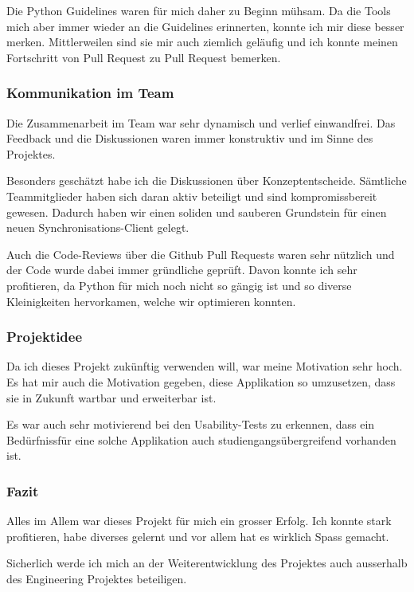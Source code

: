 \documentclass[a4paper]{article}
\begin{document}
  Die Python Guidelines waren für mich daher zu Beginn mühsam.
  Da die Tools mich aber immer wieder an die Guidelines erinnerten, konnte ich mir diese besser merken.
  Mittlerweilen sind sie mir auch ziemlich geläufig und ich konnte meinen Fortschritt von Pull Request zu Pull Request bemerken.

  \subsubsection{Kommunikation im Team}

  Die Zusammenarbeit im Team war sehr dynamisch und verlief einwandfrei.
  Das Feedback und die Diskussionen waren immer konstruktiv und im Sinne des Projektes.

  Besonders geschätzt habe ich die Diskussionen über Konzeptentscheide.
  Sämtliche Teammitglieder haben sich daran aktiv beteiligt und sind kompromissbereit gewesen.
  Dadurch haben wir einen soliden und sauberen Grundstein für einen neuen Synchronisations-Client gelegt.

  Auch die Code-Reviews über die Github Pull Requests waren sehr nützlich und der Code wurde dabei immer gründliche geprüft.
  Davon konnte ich sehr profitieren, da Python für mich noch nicht so gängig ist und so diverse Kleinigkeiten hervorkamen, welche wir optimieren konnten.

  \subsubsection{Projektidee}

  Da ich dieses Projekt zukünftig verwenden will, war meine Motivation sehr hoch.
  Es hat mir auch die Motivation gegeben, diese Applikation so umzusetzen, dass sie in Zukunft wartbar und erweiterbar ist.

  Es war auch sehr motivierend bei den Usability-Tests zu erkennen, dass ein Bedürfnissfür eine solche Applikation auch studiengangsübergreifend vorhanden ist.

  \subsubsection{Fazit}

  Alles im Allem war dieses Projekt für mich ein grosser Erfolg.
  Ich konnte stark profitieren, habe diverses gelernt und vor allem hat es wirklich Spass gemacht.

  Sicherlich werde ich mich an der Weiterentwicklung des Projektes auch ausserhalb des Engineering Projektes beteiligen.
\end{document}
